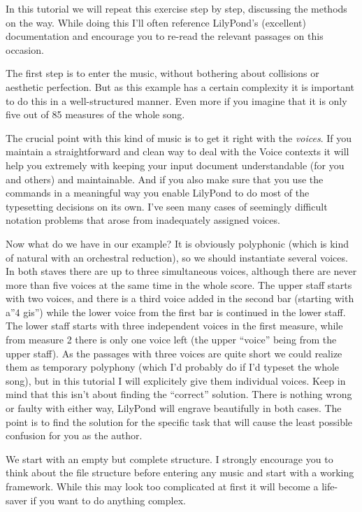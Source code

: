 \documentclass[../LilyPond-Tutorials]{subfiles}
\begin{document}
In this tutorial we will repeat this exercise step by step, discussing the methods on the way. 
While doing this I'll often reference LilyPond's (excellent) documentation and encourage you to re-read the relevant passages on this occasion.

The first step is to enter the music, without bothering about collisions or aesthetic perfection. 
But as this example has a certain complexity it is important to do this in a well-structured manner. 
Even more if you imagine that it is only five out of 85 measures of the whole song.

The crucial point with this kind of music is to get it right with the \emph{voices}. 
If you maintain a straightforward and clean way to deal with the Voice contexts  it will help you extremely with keeping your input document understandable (for you and others) and maintainable. 
And if you also make sure that you use the  commands  in a meaningful way you enable LilyPond to do most of the typesetting decisions on its own. I've seen many cases of seemingly difficult notation problems that arose from inadequately assigned voices.

Now what do we have in our example? 
It is obviously polyphonic (which is kind of natural with an orchestral reduction), so we should instantiate several voices. 
In both staves there are up to three simultaneous voices, although there are never more than five voices at the same time in the whole score. 
The upper staff starts with two voices, and there is a third voice added in the second bar (starting with a''4 gis'') while the lower voice from the first bar is continued in the lower staff. 
The lower staff starts with three independent voices in the first measure, while from measure 2 there is only one voice left (the upper “voice” being from the upper staff). 
As the passages with three voices are quite short we could realize them as temporary polyphony (which I'd probably do if I'd typeset the whole song), but in this tutorial I will explicitely give them individual voices. 
Keep in mind that this isn't about finding the “correct” solution. 
There is nothing wrong or faulty with either way, LilyPond will engrave beautifully in both cases. 
The point is to find the solution for the specific task that will cause the least possible confusion for you as the author.

We start with an empty but complete structure. 
I strongly encourage you to think about the file structure before entering any music and start with a working framework. 
While this may look too complicated at first it will become a life-saver if you want to do anything complex.
\end{document}
